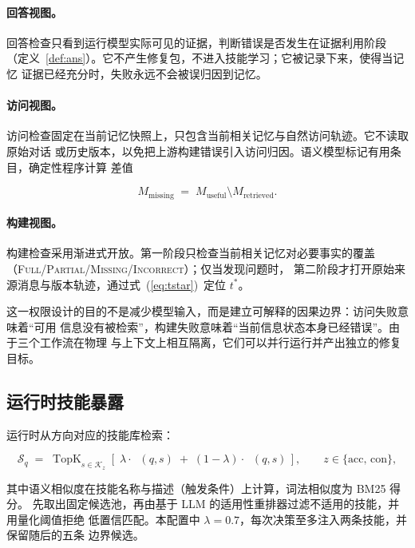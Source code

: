 \documentclass[UTF8,11pt]{ctexart}
\newcommand{\KK}{\mathcal{K}}
\DeclareMathOperator{\TopK}{TopK}
\DeclareMathOperator{\simsem}{sim_{sem}}
\DeclareMathOperator{\simlex}{sim_{lex}}
\begin{document}
\paragraph{回答视图。}
回答检查只看到运行模型实际可见的证据，判断错误是否发生在证据利用阶段
（定义~\ref{def:ans}）。它不产生修复包，不进入技能学习；它被记录下来，使得当记忆
证据已经充分时，失败永远不会被误归因到记忆。

\paragraph{访问视图。}
访问检查固定在当前记忆快照上，只包含当前相关记忆与自然访问轨迹。它不读取原始对话
或历史版本，以免把上游构建错误引入访问归因。语义模型标记有用条目，确定性程序计算
差值

\begin{equation}
\label{eq:missing}
M_{\mathrm{missing}} \;=\; M_{\mathrm{useful}} \setminus M_{\mathrm{retrieved}}.
\end{equation}

\paragraph{构建视图。}
构建检查采用渐进式开放。第一阶段只检查当前相关记忆对必要事实的覆盖
（\textsc{Full}/\textsc{Partial}/\textsc{Missing}/\textsc{Incorrect}）；仅当发现问题时，
第二阶段才打开原始来源消息与版本轨迹，通过式~(\ref{eq:tstar})~定位 $t^{*}$。

这一权限设计的目的不是减少模型输入，而是建立可解释的因果边界：访问失败意味着“可用
信息没有被检索”，构建失败意味着“当前信息状态本身已经错误”。由于三个工作流在物理
与上下文上相互隔离，它们可以并行运行并产出独立的修复目标。

\subsection{运行时技能暴露}
\label{sec:method-exposure}

运行时从方向对应的技能库检索：

\begin{equation}
\label{eq:skillretr}
\mathcal{S}_q \;=\; \TopK_{s \in \KK_z}\left[\; \lambda \cdot \simsem(q, s)
\;+\; (1-\lambda) \cdot \simlex(q, s) \,\right], \qquad z \in \{\mathrm{acc},\,\mathrm{con}\},
\end{equation}

\noindent 其中语义相似度在技能名称与描述（触发条件）上计算，词法相似度为 BM25 得分。
先取出固定候选池，再由基于 LLM 的适用性重排器过滤不适用的技能，并用量化阈值拒绝
低置信匹配。本配置中 $\lambda = 0.7$，每次决策至多注入两条技能，并保留随后的五条
边界候选。
\end{document}
